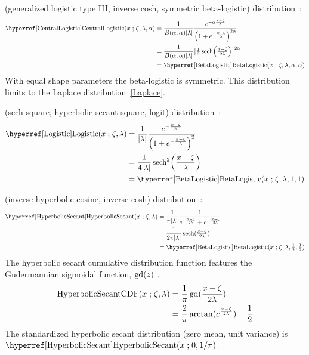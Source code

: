  (generalized logistic type III, inverse cosh, symmetric beta-logistic) distribution~\cite{Johnson1995}:
\begin{align}
\label{CentralLogistic}
\opr{CentralLogistic}(x\given \pLoc,\pScale,\alpha) 
& =
\frac{1}{B(\alpha, \alpha) |\pScale|}
 \frac{e^{-\alpha \frac{x-\pLoc}{\pScale} }} { \Left(1 + e^{-\frac{x-\pLoc}{\pScale}  }\Right)^{2\alpha} } \checked
  \\ \notag & = \frac{1}{B(\alpha, \alpha) |\pScale|} \bigl[\tfrac{1}{2} \op{sech} \Left(\tfrac{x-\pLoc}{2\pScale}  \Right)\bigr]^{2\alpha} 
  \checked 
\\ \notag & = \opr{BetaLogistic}(x\given \pLoc,\pScale,\alpha,\alpha) \checked
\end{align}
With equal shape parameters the beta-logistic is symmetric. This distribution limits to the Laplace distribution~\eqref{Laplace}.


 (sech-square, hyperbolic secant square, logit) distribution~\cite{Verhulst1845, Balakrishnan1991, Johnson1995}:
\begin{align}
\label{Logistic}
\opr{Logistic}(x\given \pLoc,\pScale) 
& =
 \frac{1}{ \Left| \pScale\Right|}
 \frac{e^{-\frac{x-\pLoc}{\pScale} }} { \Left(1 + e^{-\frac{x-\pLoc}{\pScale}  }\Right)^{2} }	\checked
 \\ \notag & = \frac{1}{4 |\pScale|} \op{sech}^2 \Left(\frac{x-\pLoc}{\pScale}  \Right)  \checked
 \\ \notag & = \opr{BetaLogistic}(x\given \pLoc,\pScale,1,1)	\checked
\end{align}





 (inverse hyperbolic cosine, inverse cosh) distribution~\cite{Johnson1995,Perks1932,Talacko1956}:
\begin{align}
\label{HyperbolicSecant}
\opr{HyperbolicSecant}(x\given \pLoc, \pScale) 
& =
\frac{1}{\pi |\pScale|}
 \frac{1}{e^{+\sfrac{x-\pLoc}{2\pScale}} + e^{- \sfrac{x-\pLoc}{2\pScale} }} \checked
 \\ & = \frac{1}{2 \pi  |\pScale|} \op{sech}(\sfrac{x-\pLoc}{2\lambda}) \notag \checked
 \\ \notag & = \opr{BetaLogistic}(x\given  \pLoc, \pScale,\tfrac{1}{2},\tfrac{1}{2}) \checked
\end{align}
The hyperbolic secant cumulative distribution function features the Gudermannian sigmoidal function, $\operatorname{gd}(z)$ . 
\begin{align*}
\operatorname{HyperbolicSecantCDF}(x\mathrel{;} \zeta, \lambda)  & = \frac{1}{\pi}\operatorname{gd}(\frac{x-\zeta}{2 \lambda})  \\
& =  \frac{2}{\pi} \arctan(e^\frac{x-\zeta}{2\lambda}) - \frac{1}{2} 
\end{align*}
The standardized hyperbolic secant distribution (zero mean, unit variance) is $\opr{HyperbolicSecant}(x\given 0, 1/\pi)\checked$.

